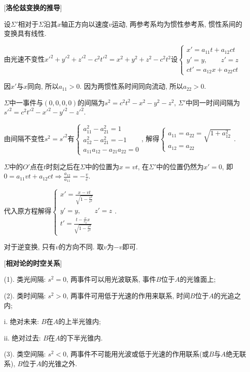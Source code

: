 [\textbf{洛伦兹变换的推导}]\par
\qquad 设$\Sigma'$相对于$\Sigma$沿其$x$轴正方向以速度$v$运动, 两参考系均为惯性参考系, 惯性系间的变换具有线性.\par
\qquad 由光速不变性$x'^2+y'^2+z'^2-c^2t'^2=x^2+y^2+z^2-c^2t^2$设$\begin{cases}x'=a_{11}t+a_{12}ct\\y'=y,\qquad z'=z\\ ct'=a_{12}x+a_{22}ct\end{cases}$\par
\qquad 因$x'$与$x$同向, 所以$a_{11}>0$. 因为两惯性系时间同向流动, 所以$a_{22}>0$.\par
\qquad $\Sigma$中一事件与$(0,0,0,0)$的间隔为$s^2=c^2t^2-x^2-y^2-z^2$, $\Sigma'$中同一时间间隔为$s'^2=c^2t'^2-x'^2-y'^2-z'^2$.\par
\qquad 由间隔不变性$s^2=s'^2$有$\begin{cases}a_{11}^2-a_{21}^2=1\\a_{12}^2-a_{21}^2=-1\\a_{11}a_{12}-a_{21}a_{22}=0\end{cases}$, 解得$\begin{cases}a_{11}=a_{22}=\sqrt{1+a_{12}^2}\\a_{12}=a_{22}\end{cases}$.\par
\qquad $\Sigma$中的$O'$点在$t$时刻之后在$\Sigma$中的位置为$x=vt$, 在$\Sigma'$中的位置仍然为$x'=0$, 即$0=a_{11}vt+a_{12}ct\Rightarrow \frac{a_{12}}{a_{11}}=-\frac{v}{c}$.\par

\clearpage

\qquad 代入原方程解得$\begin{cases}x'=\frac{x-vt}{\sqrt{1-\frac{v^2}{c^2}}}\\y'=y,\qquad z'=z\\t'=\frac{t-\frac{v}{c_2}x}{\sqrt{1-\frac{v^2}{c^2}}}\end{cases}$.\par
\qquad 对于逆变换, 只有$v$的方向不同. 取$v$为$-v$即可.\par

[\textbf{相对论的时空关系}]\par
\qquad (1). 类光间隔: $s^2=0$, 两事件可以用光波联系, 事件$B$位于$A$的光锥面上;\par
\qquad (2). 类时间隔: $s^2>0$, 两事件可用低于光速的作用来联系, 时间$B$位于$A$的光追之内;\par
\qquad \qquad i. 绝对未来: $B$在$A$的上半光锥内;\par
\qquad \qquad ii. 绝对过去: $B$在$A$的下半光锥内.\par
\qquad (3). 类空间隔: $s^2<0$, 两事件不可能用光波或低于光速的作用联系(或$B$与$A$绝无联系), $B$位于$A$的光锥之外.\par

